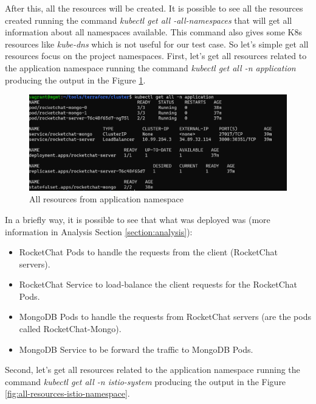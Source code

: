 \documentclass[12pt,a4paper,oneside]{report}
\begin{document}
After this, all the resources will be created. It is possible to see all the resources created running the command \textit{kubectl get all -all-namespaces} that will get all information about all namespaces available. This command also gives some \ac{K8s} resources like \textit{kube-dns} which is not useful for our test case. So let's simple get all resources focus on the project namespaces. First, let's get all resources related to the application namespace running the command \textit{kubectl get all -n application} producing the output in the Figure \ref{fig:all-resources-application-namespace}.

\begin{figure}[h]
    \centering
    \includegraphics[width=1.0\textwidth]{./pictures/kubctl-get-all-application-ns.png}
    \caption{All resources from application namespace}
    \label{fig:all-resources-application-namespace}
\end{figure}

In a briefly way, it is possible to see that what was deployed was (more information in Analysis Section \ref{section:analysis}):
\begin{itemize}
    \item RocketChat Pods to handle the requests from the client (RocketChat servers).
    \item RocketChat Service to load-balance the client requests for the RocketChat Pods.
    \item MongoDB Pods to handle the requests from RocketChat servers (are the pods called RocketChat-Mongo).
    \item MongoDB Service to be forward the traffic to MongoDB Pods.
\end{itemize}

Second, let's get all resources related to the application namespace running the command \textit{kubectl get all -n istio-system} producing the output in the Figure \ref{fig:all-resources-istio-namespace}.
\end{document}
